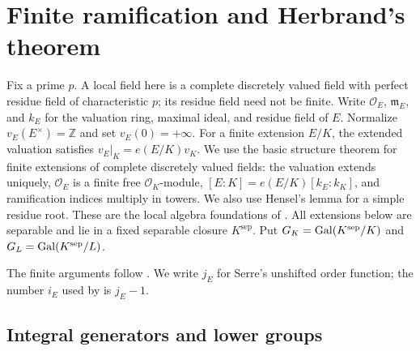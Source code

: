 \chapter{Finite ramification and Herbrand's theorem}

Fix a prime $p$. A local field here is a complete discretely valued field
with perfect residue field of characteristic $p$; its residue field need
not be finite. Write $\mathcal O_E$, $\mathfrak m_E$, and $k_E$ for the
valuation ring, maximal ideal, and residue field of $E$. Normalize
$v_E(E^\times)=\mathbb Z$ and set $v_E(0)=+\infty$.
For a finite extension $E/K$, the extended valuation satisfies
$v_E|_K=e(E/K)v_K$. We use the basic structure theorem for finite
extensions of complete discretely valued fields: the valuation extends
uniquely, $\mathcal O_E$ is a finite free $\mathcal O_K$-module,
$[E:K]=e(E/K)[k_E:k_K]$, and ramification indices multiply in towers.
We also use Hensel's lemma for a simple residue root.
These are the local algebra foundations of \cite[Chapters I--II]{Serre1979}.
All extensions below are separable and lie in a fixed separable closure
$K^{\mathrm{sep}}$. Put $G_K=\operatorname{Gal}(K^{\mathrm{sep}}/K)$ and
$G_L=\operatorname{Gal}(K^{\mathrm{sep}}/L)$.

The finite arguments follow \cite[Chapter IV, Sections 1 and 3]{Serre1979}.
We write $j_E$ for Serre's unshifted order function; the number $i_E$ used
by \cite{Wintenberger1983} is $j_E-1$.

\section{Integral generators and lower groups}

